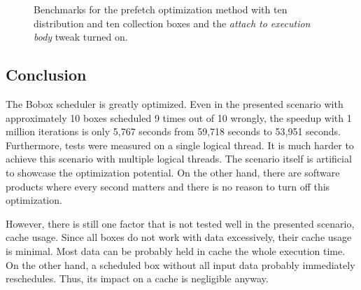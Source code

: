 \begin{figure}[h!]
\vspace{.5cm}
\centering
{}
\caption{Benchmarks for the prefetch optimization method with ten distribution and ten collection boxes and the \textit{attach to execution body} tweak turned on.}
\label{prefetch-bench-attach}
\end{figure}

\subsection{Conclusion}
The Bobox scheduler is greatly optimized. Even in the presented scenario with approximately 10 boxes scheduled 9 times out of 10 wrongly, the speedup with 1 million iterations is only 5,767 seconds from 59,718 seconds to 53,951 seconds. Furthermore, tests were measured on a single logical thread. It is much harder to achieve this scenario with multiple logical threads. The scenario itself is artificial to showcase the optimization potential. On the other hand, there are software products where every second matters and there is no reason to turn off this optimization.

However, there is still one factor that is not tested well in the presented scenario, cache usage. Since all boxes do not work with data excessively, their cache usage is minimal. Most data can be probably held in cache the whole execution time. On the other hand, a scheduled box without all input data probably immediately reschedules. Thus, its impact on a cache is negligible anyway.

